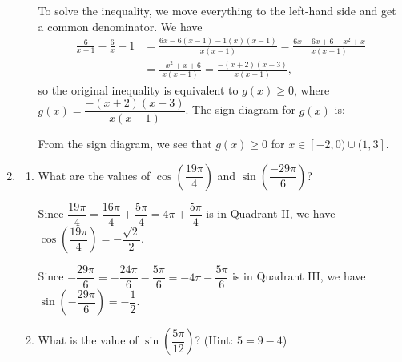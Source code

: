 \documentclass[12pt]{article}
\newcommand{\points}[1]{\marginpar{\hspace{24pt}[#1]}}
\begin{document}
\begin{enumerate}
\begin{enumerate}
To solve the inequality, we move everything to the left-hand side and get a common denominator. We have
\begin{align*}
 \frac{6}{x-1}-\frac{6}{x}-1 &= \frac{6x-6(x-1)-1(x)(x-1)}{x(x-1)} = \frac{6x-6x+6-x^2+x}{x(x-1)}\\
& = \frac{-x^2+x+6}{x(x-1)} = \frac{-(x+2)(x-3)}{x(x-1)},
\end{align*}
so the original inequality is equivalent to $g(x)\geq 0$, where $g(x) = \dfrac{-(x+2)(x-3)}{x(x-1)}$. The sign diagram for $g(x)$ is:
\begin{center}
\end{center}
From the sign diagram, we see that $g(x)\geq 0$ for $x\in [-2,0)\cup (1,3]$.
\end{enumerate}

\newpage

\item \begin{enumerate}
       \item What are the values of $\cos\left(\dfrac{19\pi}{4}\right)$ and $\sin\left(\dfrac{-29\pi}{6}\right)$? \points{2}

\bigskip

Since $\dfrac{19\pi}{4} = \dfrac{16\pi}{4}+\dfrac{5\pi}{4} = 4\pi +\dfrac{5\pi}{4}$ is in Quadrant II, we have $\cos\left(\dfrac{19\pi}{4}\right) = -\dfrac{\sqrt{2}}{2}$.

\medskip

Since $-\dfrac{29\pi}{6} = -\dfrac{24\pi}{6}-\dfrac{5\pi}{6} = -4\pi - \dfrac{5\pi}{6}$ is in Quadrant III, we have $\sin\left(-\dfrac{29\pi}{6}\right) = -\dfrac{1}{2}$.

\bigskip

 \item What is the value of $\sin\left(\dfrac{5\pi}{12}\right)$? (Hint: $5=9-4$)\points{4}

\bigskip


\end{enumerate}
\end{enumerate}
\end{document}
